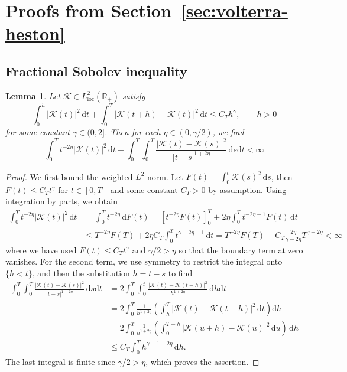 \documentclass[10pt,a4paper,reqno]{amsart}
\newcommand{\R}{\mathbb{R}}
\theoremstyle{plain}
\newtheorem{lemma}[theorem]{Lemma}
\theoremstyle{definition}
\theoremstyle{remark}
\theoremstyle{example}
\begin{document}
\appendix
\section{Proofs from Section~\ref{sec:volterra-heston}}\label{sec:proofs-from-section}


\subsection{Fractional Sobolev inequality}\label{sec:1}

\begin{lemma}\label{lemma: fractional Sobolev}
    Let $\mathcal{K} \in L_{\mathrm{loc}}^2(\R_+)$ satisfy 
    $$
        \int_0^h |\mathcal{K}(t)|^2\, \mathrm{d}t + \int_0^T |\mathcal{K}(t+h) - \mathcal{K}(t)|^2\, \mathrm{d}t \leq C_T h^{\gamma}, \qquad h > 0
    $$
    for some constant $\gamma \in (0,2]$. Then for each $\eta \in (0,\gamma/2)$, we find
    $$
        \int_0^T t^{-2\eta}|\mathcal{K}(t)|^2\, \mathrm{d}t + \int_0^T \int_0^T \frac{|\mathcal{K}(t) - \mathcal{K}(s)|^2}{|t-s|^{1+2\eta}}\, \mathrm{d}s\mathrm{d}t < \infty
    $$
\end{lemma}
\begin{proof}
    We first bound the weighted $L^2$-norm. Let $F(t) = \int_0^t \mathcal{K}(s)^2 \, \mathrm{d}s$, then $F(t) \leq C_T t^{\gamma}$ for $t \in [0,T]$ and some constant $C_T > 0$ by assumption. Using integration by parts, we obtain
    \begin{align*}
        \int_0^T t^{-2\eta} |\mathcal{K}(t)|^2 \, \mathrm{d}t 
        &= \int_0^T t^{-2\eta} \, \mathrm{d}F(t) = \left[ t^{-2\eta} F(t) \right]_0^T + 2\eta \int_0^T t^{-2\eta-1} F(t) \, \mathrm{d}t
        \\ &\leq T^{-2\eta}F(T) + 2\eta C_T \int_0^T t^{\gamma - 2\eta - 1} \, \mathrm{d}t
        = T^{-2\eta}F(T) + C_T \frac{2\eta}{\gamma - 2\eta} T^{\gamma - 2\eta} < \infty
    \end{align*}
    where we have used $F(t) \leq C_T t^{\gamma}$ and $\gamma/2 > \eta$ so that the boundary term at zero vanishes. For the second term, we use symmetry to restrict the integral onto $\{h < t\}$, and then the substitution $h = t - s$ to find
    \begin{align*}
        \int_0^T \int_0^T \frac{|\mathcal{K}(t) - \mathcal{K}(s)|^2}{|t-s|^{1+2\eta}} \, \mathrm{d}s \mathrm{d}t 
        &= 2 \int_0^T \int_0^t \frac{|\mathcal{K}(t) - \mathcal{K}(t-h)|^2}{h^{1+2\eta}} \, \mathrm{d}h \mathrm{d}t
        \\ &= 2 \int_0^T \frac{1}{h^{1+2\eta}} \left( \int_h^T |\mathcal{K}(t) - \mathcal{K}(t-h)|^2 \, \mathrm{d}t \right) \mathrm{d}h
        \\ &= 2 \int_0^T \frac{1}{h^{1+2\eta}} \left( \int_0^{T-h} |\mathcal{K}(u+h) - \mathcal{K}(u)|^2 \, \mathrm{d}u \right)\, \mathrm{d}h
        \\ &\leq C_T\int_0^T h^{\gamma - 1 - 2\eta}\, \mathrm{d}h.
    \end{align*}
    The last integral is finite since $\gamma/2 > \eta$, which proves the assertion.
\end{proof}
\end{document}

